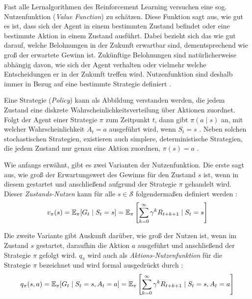 Fast alle Lernalgorithmen des Reinforcement Learning versuchen eine sog. Nutzenfunktion (\textit{Value Function}) zu schätzen. Diese Funktion sagt aus, \glqq wie gut\grqq{} es ist, dass sich der Agent in einem bestimmten Zustand befindet oder eine bestimmte Aktion in einem Zustand ausführt. Dabei bezieht sich das \glqq wie gut\grqq{} darauf,
welche Belohnungen in der Zukunft erwartbar sind, dementsprechend wie groß der erwartete Gewinn ist. Zukünftige Belohnungen sind natürlicherweise abhängig davon, wie sich der Agent verhalten oder vielmehr welche Entscheidungen er in der Zukunft treffen wird. Nutzenfunktion sind deshalb immer in Bezug auf eine bestimmte Strategie definiert \cite[S.~58]{Sutton1998}.
\par 
Eine Strategie (\textit{Policy}) kann als Abbildung verstanden werden, die jedem Zustand eine diskrete Wahrscheinlichkeitsverteilung über Aktionen zuordnet. Folgt der Agent einer Strategie $\pi$ zum Zeitpunkt $t$, dann gibt $\pi(a\mid s)$ an, mit welcher Wahrscheinlichkeit $A_t = a$ ausgeführt wird, wenn $S_t = s$ \cite[S.~58]{Sutton1998}. Neben solchen stochastischen Strategien, existieren auch simplere, deterministische Strategien, die jedem Zustand nur genau eine Aktion zuordnen, $\pi (s) = a$ \cite[]{Brunskill}.
\par
Wie anfangs erwähnt, gibt es zwei Varianten der Nutzenfunktion. Die erste sagt aus, wie groß der Erwartungswert des Gewinns für den Zustand $s$ ist, wenn in diesem gestartet und anschließend aufgrund der Strategie $\pi$ gehandelt wird. Dieser \textit{Zustands-Nutzen} kann für alle $s \in \mathcal{S}$ folgendermaßen definiert werden \cite[S.~58]{Sutton1998}:
\begin{equation}\label{eq:valueFunction}
    v_\pi(s) = \operatorname{\mathbb{E}}_\pi[G_t \mid S_t = s] = \operatorname{\mathbb{E}}_\pi \left[\sum_{k=0}^\infty{\gamma^k R_{t+k+1} \mid S_t = s} \right]
\end{equation}

Die zweite Variante gibt Auskunft darüber, wie groß der Nutzen ist, wenn im Zustand $s$ gestartet, daraufhin die Aktion $a$ ausgeführt und anschließend der Strategie $\pi$ gefolgt wird. $q_\pi$ wird auch als \textit{Aktions-Nutzenfunktion} für die Strategie $\pi$ bezeichnet und wird formal ausgedrückt durch \cite[S.~58]{Sutton1998}:
\begin{equation}\label{eq:actionValueFunction}
    q_\pi(s,a) = \operatorname{\mathbb{E}}_\pi[G_t \mid S_t = s, A_t = a] = \operatorname{\mathbb{E}}_\pi\left[\sum_{k=0}^\infty{\gamma^k R_{t+k+1} \mid S_t = s, A_t = a}\right]
\end{equation}